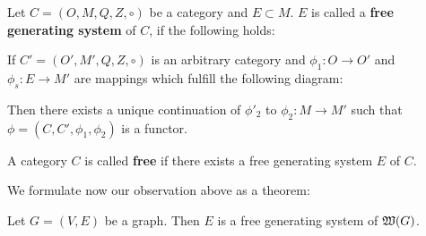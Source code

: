 \begin{definition}
Let $C = (O, M, Q, Z, \circ)$ be a category and $E \subset M$. $E$ is called a
{\bf free generating system} of $C$, if the following holds:

If $C' = (O', M', Q, Z, \circ)$ is an arbitrary category and $\phi_1 : O \to O'$
and $\phi_s : E \to M'$ are mappings which fulfill the following diagram:

\begin{center}
\end{center}

Then there exists a unique continuation of $\phi'_2$ to $\phi_2 : M \to M'$ such
that $\phi = (C, C', \phi_1, \phi_2)$ is a functor.
\end{definition}

\begin{definition}
A category $C$ is called {\bf free} if there exists a free generating system $E$
of $C$.
\end{definition}

We formulate now our observation above as a theorem:

\begin{theorem}
Let $G=(V, E)$ be a graph. Then $E$ is a free generating system of
$\mbox{$\mathfrak{W}(G)$}$.
\end{theorem}


